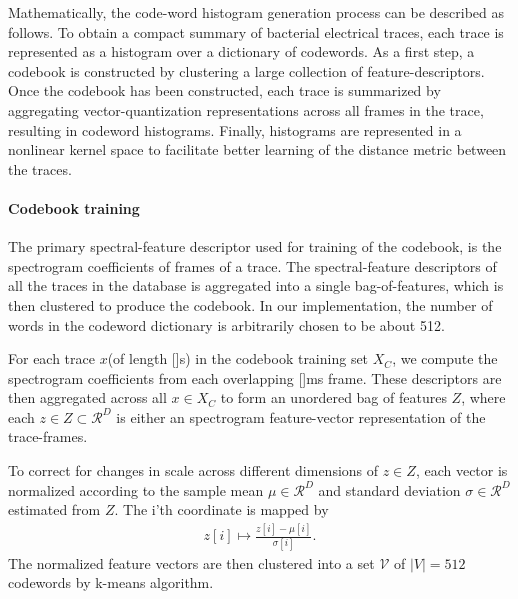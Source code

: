 \documentclass[10pt]{article}
\begin{document}
Mathematically, the code-word histogram generation process can be described as follows. To obtain a compact summary of bacterial electrical traces, each trace is represented as a histogram over a dictionary of codewords. As a first step, a codebook is constructed by clustering a large collection of feature-descriptors. Once the codebook has been constructed, each trace is summarized by aggregating vector-quantization representations across all frames in the trace, resulting in codeword histograms. Finally, histograms are represented in a nonlinear kernel space to facilitate better learning of the distance metric between the traces. 

\paragraph{Codebook training}
The primary spectral-feature descriptor used for training of the codebook, is the spectrogram coefficients of frames of a trace. The spectral-feature descriptors of all the traces in the database is aggregated into a single bag-of-features, which is then clustered to produce the codebook. In our implementation, the number of words in the codeword dictionary is arbitrarily chosen to be about 512. 

For each trace $x$(of length []s) in the codebook training set $X_C$, we compute the spectrogram coefficients from each overlapping []ms frame. These descriptors are then aggregated across all $x \in X_C$ to form an unordered bag of features $Z$, where each $ z \in Z \subset \mathcal{R}^D $ is either an spectrogram feature-vector representation of the trace-frames.

To correct for changes in scale across different dimensions of $ z \in Z$, each vector is normalized according to the sample mean $\mu \in \mathcal{R}^D$ and standard deviation $\sigma \in \mathcal{R}^D$ estimated from $Z$. The i'th coordinate is mapped by
\begin{align}
z[i] \mapsto \frac{z[i] - \mu[i]}{\sigma[i]}. \label{eq:NormlizeSPECG}
\end{align}The normalized feature vectors are then clustered into a set $\mathcal{V}$ of $|V| = 512$ codewords by k-means algorithm.
\end{document}
